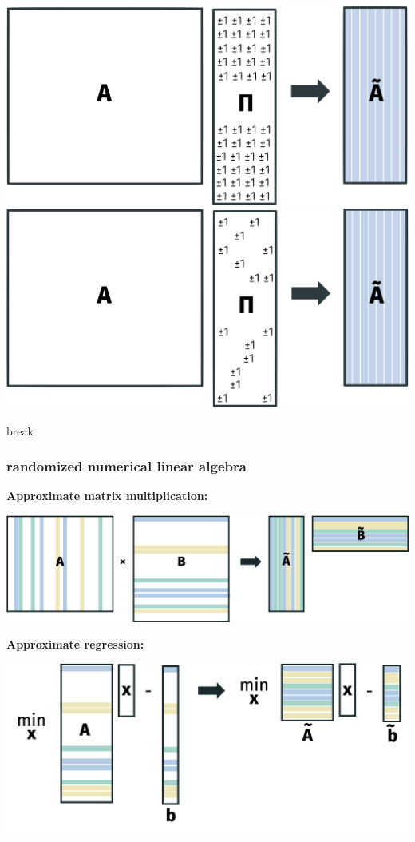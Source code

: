 \documentclass[compress]{beamer}
\begin{document}
\begin{frame}
\begin{center}
	 \includegraphics[height=.25\textheight]{projection_column_reduction1.png}\hfill
	\includegraphics[height=.25\textheight]{projection_column_reduction2.png}
\end{center}
\end{frame}

\begin{frame}[standout]
	\begin{center}
			\large break
		\end{center}
\end{frame}

\begin{frame}[t]
	\frametitle{randomized numerical linear algebra}
	\textbf{Approximate matrix multiplication:}
	\begin{center}
		\includegraphics[width=.9\textwidth]{matrix_mult.png}
	\end{center}
	\textbf{Approximate regression:}
	\begin{center}
		\includegraphics[width=.7\textwidth]{subsampledRegressioon.png}
	\end{center}
\end{frame}
\end{document}
